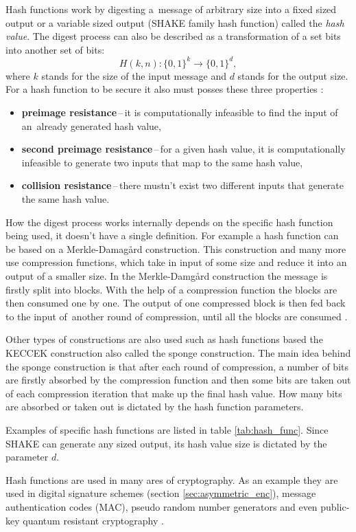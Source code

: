 Hash functions work by digesting a~message of arbitrary size into a fixed sized output or a variable sized output (SHAKE family hash function) called the \textit{hash value}. The digest process can also be described as a transformation of a set bits into another set of bits:
\begin{equation}
  H(k, n): \{0,1\}^k \rightarrow \{0,1\}^d,
\end{equation}
where $k$ stands for the size of the input message and $d$ stands for the output size. 
\newpage
\noindent For a hash function to be secure it also must posses these three properties \cite{Paar2010}:
\begin{itemize}
  \item \textbf{preimage resistance}\,--\,it is computationally infeasible to find the input of an~already generated hash value,
  \item \textbf{second preimage resistance}\,--\,for a given hash value, it is computationally infeasible to generate two inputs that map to the same hash value,
  \item \textbf{collision resistance}\,--\,there mustn't exist two different inputs that generate the same hash value.
\end{itemize}

How the digest process works internally depends on the specific hash function being used, it doesn't have a single definition. For example a hash function can be based on a Merkle-Damag\aa rd construction. This construction and many more use compression functions, which take in input of some size and reduce it into an output of a smaller size. In the Merkle-Damg\aa rd construction the message is firstly split into blocks. With the help of a compression function the blocks are then consumed one by one. The output of one compressed block is then fed back to the input of~another round of compression, until all the blocks are consumed \cite{Smart2004}. 

Other types of constructions are also used such as hash functions based the KECCEK construction also called the sponge construction. The main idea behind the sponge construction is that after each round of compression, a number of bits are firstly absorbed by the compression function and then some bits are taken out of each compression iteration that make up the final hash value. How many bits are absorbed or taken out is dictated by the hash function parameters. \cite{1Od8f4TuMxetfmHu}

Examples of specific hash functions are listed in table \ref{tab:hash_func}. Since SHAKE can generate any sized output, its hash value size is dictated by the parameter $d$.


Hash functions are used in many ares of cryptography. As an example they are used in digital signature schemes (section \ref{sec:asymmetric_enc}), message authentication codes (\acs{MAC}), pseudo random number generators and even public-key quantum resistant cryptography \cite{Chen2016}. 


